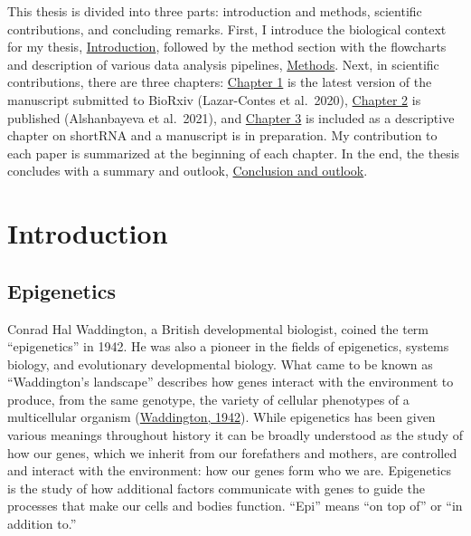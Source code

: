 \documentclass[12pt,twoside]{reedthesis}
\begin{document}
This thesis is divided into three parts: introduction and methods, scientific contributions, and concluding remarks. First, I introduce the biological context for my thesis, \protect\hyperlink{intro}{Introduction}, followed by the method section with the flowcharts and description of various data analysis pipelines, \protect\hyperlink{methods}{Methods}. Next, in scientific contributions, there are three chapters: \protect\hyperlink{chapter1}{Chapter 1} is the latest version of the manuscript submitted to BioRxiv (Lazar-Contes et al.~2020), \protect\hyperlink{chapter2}{Chapter 2} is published (Alshanbayeva et al.~2021), and \protect\hyperlink{chapter3}{Chapter 3} is included as a descriptive chapter on shortRNA and a manuscript is in preparation. My contribution to each paper is summarized at the beginning of each chapter. In the end, the thesis concludes with a summary and outlook, \protect\hyperlink{conclusion}{Conclusion and outlook}.

\hypertarget{intro}{%
\chapter*{Introduction}\label{intro}}

\hypertarget{epigenetics}{%
\section*{Epigenetics}\label{epigenetics}}

Conrad Hal Waddington, a British developmental biologist, coined the
term ``epigenetics'' in 1942. He was also a pioneer in the fields of
epigenetics, systems biology, and evolutionary developmental biology.
What came to be known as ``Waddington's landscape'' describes how genes
interact with the environment to produce, from the same genotype, the
variety of cellular phenotypes of a multicellular organism
(\protect\hyperlink{ref-waddington_1942}{Waddington, 1942}). While epigenetics has been given various meanings
throughout history it can be broadly understood as the study of how our genes, which we inherit from our forefathers and mothers, are controlled and interact
with the environment: how our genes form who we are. Epigenetics is the
study of how additional factors communicate with genes to guide the
processes that make our cells and bodies function. ``Epi'' means ``on top
of'' or ``in addition to.''
\end{document}
